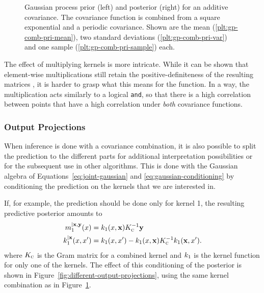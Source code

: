  \begin{figure}
  \setlength{}%
  \setlength\figureheight{0.618\figurewidth}%
  \caption[Gaussian process prior and posterior for an additive
covariance.]{Gaussian process prior (left) and posterior (right) for an
additive covariance. The covariance function is combined from a square
exponential and a periodic covariance. Shown are the mean
(\ref*{plt:gp-comb-pri-mean}), two standard deviations
(\ref*{plt:gp-comb-pri-var}) and one sample (\ref*{plt:gp-comb-pri-sample})
each.}
  \label{fig:kernel-combination}
\end{figure}

The effect of multiplying kernels is more intricate. While it can be shown that
element-wise multiplications still retain the positive-definiteness of the
resulting matrices \cite{Schur:1911:Bemerkungen}, it is harder to grasp what
this means for the function. In a way, the multiplication acts similarly to a
logical \texttt{and}, so that there is a high correlation between points that
have a high correlation under \emph{both} covariance functions.

\subsubsection{Output Projections}
\label{sec:output-projections}

When inference is done with a covariance combination, it is also possible to
split the prediction to the different parts for additional interpretation
possibilities or for the subsequent use in other algorithms. This is done with
the Gaussian algebra of Equations~\eqref{eq:joint-gaussian} and
\eqref{eq:gaussian-conditioning} by conditioning the prediction on the kernels
that we are interested in.

\pagebreak[4]

If, for example, the prediction should be done only for kernel 1, the
resulting predictive posterior amounts to \cite{Duvenaud:2014:Automatic}
\begin{subequations}
\label{eq:output-projection}
\begin{align}
m^{|\mathbf{x},\mathbf{y}}_1(x) &= k_1(x,\mathbf{x}) K_{{\normalfont\textsc{c}}}^{-1}
\mathbf{y}\\
k^{|\mathbf{x}}_1(x,x') &= k_1(x,x') -k_1(x,\mathbf{x})
K_{{\normalfont\textsc{c}}}^{-1}
  k_1(\mathbf{x},x').
\end{align}
\end{subequations}
where $K_{\normalfont\textsc{c}}$ is the Gram matrix for a combined kernel and $k_1$ is
the kernel function for only one of the kernels. The effect of this conditioning
of the posterior is shown in Figure~\ref{fig:different-output-projections},
using the same kernel combination as in Figure~\ref{fig:kernel-combination}.

